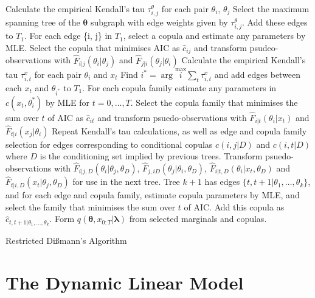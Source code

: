 \documentclass[12pt,a4paper]{article}%
\numberwithin{equation}{section}
\begin{document}
\begin{algorithm}[H]
 Calculate the empirical Kendall's tau $\tau^{\theta}_{i, j}$ for each pair $\theta_i$, $\theta_j$ \;
 Select the maximum spanning tree of the $\boldsymbol{\theta}$ subgraph with edge weights given by $\tau^{\theta}_{i, j}$. Add these edges to $T_1$.\;
 For each edge \{i, j\} in $T_1$, select a copula and estimate any parameters by MLE. Select the copula that minimises AIC as $\hat{c}_{ij}$ and transform psudeo-observations with $\hat{F}_{i|j}(\theta_i|\theta_j)$ and $\hat{F}_{j|i}(\theta_j|\theta_i)$\;
 Calculate the empirical Kendall's tau $\tau^{x}_{i, t}$ for each pair $\theta_i$ and $x_t$ \;
 Find $i^* = \arg \overset{\max}{i} \sum_t \tau^{x}_{i, t}$ and add edges between each $x_t$ and $\theta_{i^*}$ to $T_1$.\;
 For each copula family estimate any parameters in $c(x_t, \theta_i^*)$ by MLE for $t = 0, \dots, T$. Select the copula family that minimises the sum over $t$ of AIC as $\hat{c}_{it}$ and transform psuedo-observations with $\hat{F}_{i|t}(\theta_i|x_t)$ and $\hat{F}_{t|i}(x_j|\theta_i)$\;
  {
  Repeat Kendall's tau calculations, as well as edge and copula family selection for edges corresponding to conditional copulas $c(i, j | D)$ and $c(i, t | D)$ where $D$ is the conditioning set implied by previous trees.\;
  Transform psuedo-observations with $\hat{F}_{i|j, D}(\theta_i | \theta_j, \theta_D)$, $\hat{F}_{j, i D} (\theta_j | \theta_i, \theta_D)$, $\hat{F}_{i|t, D}(\theta_i | x_t, \theta_D)$ and $\hat{F}_{t|i, D}(x_t | \theta_j, \theta_D)$ for use in the next tree.
 }
 Tree $k+1$ has edges $\{t, t+1 | \theta_1, \dots, \theta_k\}$, and for each edge and copula family, estimate copula parameters by MLE, and select the family that minimises the sum over $t$ of AIC. Add this copula as $\hat{c}_{t, t+1 | \theta_1, \dots, \theta_k}$. \;
 Form $q(\boldsymbol{\theta}, x_{0:T} | \boldsymbol{\lambda})$ from selected marginals and copulas.
 \caption{Restricted Di{\ss}mann's Algorithm}
  \label{alg:copula}
\end{algorithm}


\section{The Dynamic Linear Model}
\label{DLM}
\end{document}
